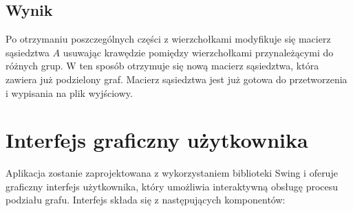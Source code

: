 \documentclass{article}
\begin{document}
    \subsection{Wynik}

    Po otrzymaniu poszczególnych części z wierzchołkami modyfikuje się macierz sąsiedztwa \(A\) usuwając krawędzie pomiędzy wierzchołkami przynależącymi do różnych grup. W ten sposób otrzymuje się nową macierz sąsiedztwa, która zawiera już podzielony graf. Macierz sąsiedztwa jest już gotowa do przetworzenia i wypisania na plik wyjściowy.
    


\section{Interfejs graficzny użytkownika}

    Aplikacja zostanie zaprojektowana z wykorzystaniem biblioteki Swing i oferuje graficzny interfejs użytkownika, który umożliwia interaktywną obsługę procesu podziału grafu. Interfejs składa się z następujących komponentów:
\end{document}

